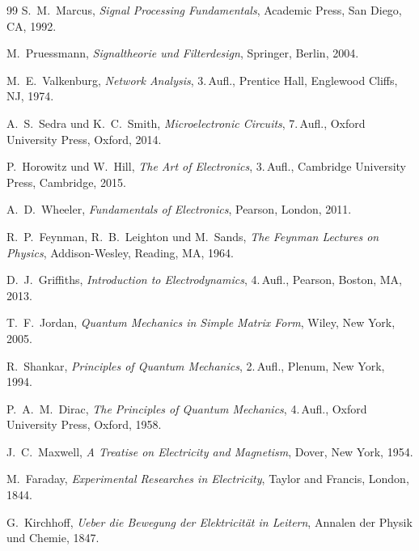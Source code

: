 \documentclass[a4paper, 12pt, twoside, openright]{report}
\theoremstyle{definition}
\theoremstyle{definition}
\begin{document}
\begin{thebibliography}{99}
	S.~M.~Marcus,
	\textit{Signal Processing Fundamentals},
	Academic Press, San Diego, CA, 1992.

	M.~Pruessmann,
	\textit{Signaltheorie und Filterdesign},
	Springer, Berlin, 2004.

	M.~E.~Valkenburg,
	\textit{Network Analysis},
	3.\,Aufl., Prentice Hall, Englewood Cliffs, NJ, 1974.

	A.~S.~Sedra und K.~C.~Smith,
	\textit{Microelectronic Circuits},
	7.\,Aufl., Oxford University Press, Oxford, 2014.

	P.~Horowitz und W.~Hill,
	\textit{The Art of Electronics},
	3.\,Aufl., Cambridge University Press, Cambridge, 2015.

	A.~D.~Wheeler,
	\textit{Fundamentals of Electronics},
	Pearson, London, 2011.

	R.~P.~Feynman, R.~B.~Leighton und M.~Sands,
	\textit{The Feynman Lectures on Physics},
	Addison-Wesley, Reading, MA, 1964.

	D.~J.~Griffiths,
	\textit{Introduction to Electrodynamics},
	4.\,Aufl., Pearson, Boston, MA, 2013.

	T.~F.~Jordan,
	\textit{Quantum Mechanics in Simple Matrix Form},
	Wiley, New York, 2005.

	R.~Shankar,
	\textit{Principles of Quantum Mechanics},
	2.\,Aufl., Plenum, New York, 1994.

	P.~A.~M.~Dirac,
	\textit{The Principles of Quantum Mechanics},
	4.\,Aufl., Oxford University Press, Oxford, 1958.

	J.~C.~Maxwell,
	\textit{A Treatise on Electricity and Magnetism},
	Dover, New York, 1954.

	M.~Faraday,
	\textit{Experimental Researches in Electricity},
	Taylor and Francis, London, 1844.

	G.~Kirchhoff,
	\textit{Ueber die Bewegung der Elektricität in Leitern},
	Annalen der Physik und Chemie, 1847.


\end{thebibliography}
\end{document}
